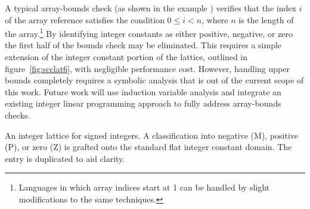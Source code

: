 \documentclass[12pt,titlepage,twoside]{article}
\newcommand*{\figscale}{1.0}
\begin{document}
A typical array-bounds check (as shown in the example )
verifies that the index $i$ of the array reference satisfies the
condition $0\leq i < n$, where $n$ is the length of the
array.\footnote{Languages in which array indices start at 1 can be
handled by slight modifications to the same techniques.} By
identifying integer constants as either positive, negative, or zero
the first half of the bounds check may be eliminated.  This requires a
simple extension of the integer constant portion of the lattice,
outlined in figure~\vref{fig:scclat6}, with
negligible performance cost.  However, handling upper bounds
completely requires a symbolic analysis that is out of the current
scope of this work.  Future work will use induction variable analysis
and integrate an existing integer linear programming approach
\cite{rugina99:divide} to fully address array-bounds checks.
\begin{myfigure}[t]
\centering\renewcommand*{\figscale}{0.6}
\caption[An integer lattice for signed integers.]
{An integer lattice for signed integers. A classification into
negative (M), positive (P), or zero (Z) is grafted onto the standard
flat integer constant domain.  The  entry is duplicated to
aid clarity.}
\label{fig:scclat6}
\end{myfigure}
\end{document}
